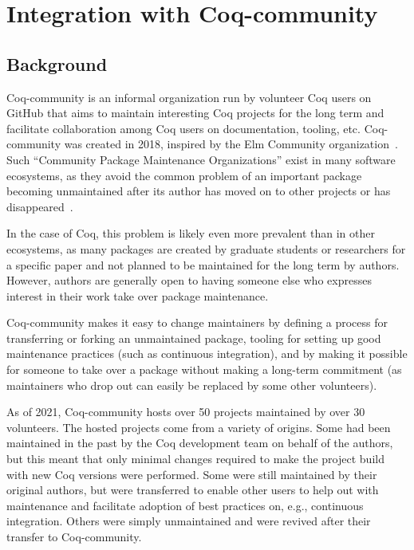 \documentclass{easychair}
\newcommand{\TODO}[2][]{[\textcolor{red}{TODO (#1):} \emph{#2}]}
\newcommand{\coq}{Coq\xspace}
\newcommand{\community}{Coq-community\xspace}
\begin{document}
\label{sect:not-pr}



\section{Integration with \community}

\subsection{Background}

\community is an informal organization run by volunteer Coq users on GitHub that aims to maintain interesting Coq projects for the long term and facilitate collaboration among Coq users on documentation, tooling, etc. \community was created in 2018, inspired by the {Elm Community} organization~\cite{zimmermann:tel-02451322}.
%
Such ``Community Package Maintenance Organizations'' exist in many software ecosystems, as they avoid the common problem of an important package becoming unmaintained after its author has moved on to other projects or has disappeared~\cite{zimmermann2021grounded}.

In the case of \coq, this problem is likely even more prevalent than in other ecosystems, as many packages are created by graduate students or researchers for a specific paper and not planned to be maintained for the long term by authors.
%
However, authors are generally open to having someone else who expresses interest in their work take over package maintenance.
%

\community makes it easy to change maintainers by defining a process for transferring or forking an unmaintained package, tooling for setting up good maintenance practices (such as continuous integration), and by making it possible for someone to take over a package without making a long-term commitment (as maintainers who drop out can easily be replaced by some other volunteers).

As of 2021, \community hosts over 50 projects maintained by over 30 volunteers.
%
The hosted projects come from a variety of origins.
%
Some had been maintained in the past by the \coq development team on behalf of the authors, but this meant that only minimal changes required to make the project build with new \coq versions were performed.
%
Some were still maintained by their original authors, but were transferred to enable other users to help out with maintenance and facilitate adoption of best practices on, e.g., continuous integration.
%
Others were simply unmaintained and were revived after their transfer to \community.
\end{document}
